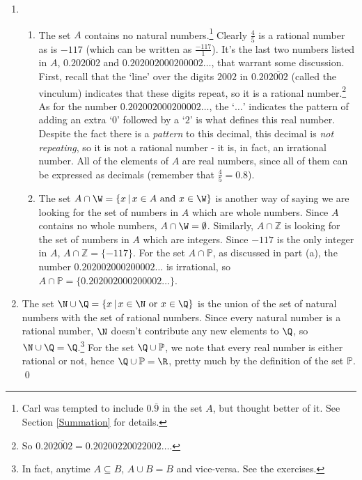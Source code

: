 \begin{ex}
\begin{enumerate}
\label{repeatingdecimalnote}

\item  \begin{enumerate} \item The set $A$ contains no natural numbers.\footnote{Carl was tempted to include $0.\overline{9}$ in the set $A$, but thought better of it.  See Section \ref{Summation} for details.}  Clearly $\frac{4}{5}$ is a rational number as is $-117$ (which can be written as $\frac{-117}{1}$). It's the last two numbers listed in $A$, $0.20\overline{2002}$ and $0.202002000200002 \ldots$, that warrant some discussion.  First, recall that the `line' over the digits $2002$ in $0.20\overline{2002}$ (called the vinculum) indicates that these digits repeat, so it is a rational number.\footnote{So $0.20\overline{2002} = 0.20200220022002 \ldots$.}  As for the number $0.202002000200002 \ldots$, the `$\ldots$' indicates the pattern of adding an extra `$0$' followed by a `$2$' is what defines this real number.  Despite the fact there is a \textit{pattern} to this decimal, this decimal is \textit{not repeating}, so it is not a rational number - it is, in fact, an irrational number.  All of the elements of $A$ are real numbers, since all of them can be expressed as decimals (remember that $\frac{4}{5} = 0.8$).

\item  The set $A \cap \W = \{ x \, | \, \text{$x \in A$ and $x \in \W$} \}$ is another way of saying we are looking for the set of numbers in $A$ which are whole numbers.  Since $A$ contains no whole numbers, $A \cap \W = \emptyset$.  Similarly, $A \cap \mathbb Z$ is looking for the set of numbers in $A$ which are integers.  Since $-117$ is the only integer in $A$,  $A \cap \mathbb Z = \{ -117 \}$. For the set $A \cap \mathbb P$, as discussed in part (a), the number $0.202002000200002 \ldots$ is irrational, so $A \cap \mathbb P = \{ 0.202002000200002 \ldots \}$.

\end{enumerate}

\item  The set $\N \cup \Q = \{ x \, | \, \text{$x \in \N$ or $x \in \Q$} \}$ is the union of the set of natural numbers with the set of rational numbers.  Since every natural number is a rational number, $\N$ doesn't contribute any new elements to $\Q$, so $\N \cup \Q = \Q$.\footnote{In fact, anytime $A \subseteq B$, $A \cup B = B$ and vice-versa.  See the exercises.}  For the  set $\Q \cup \mathbb P$, we note that every real number is either rational or not, hence $\Q \cup \mathbb P = \R$, pretty much by the definition of the set $\mathbb P$.  \qed


\end{enumerate}


\end{ex}

